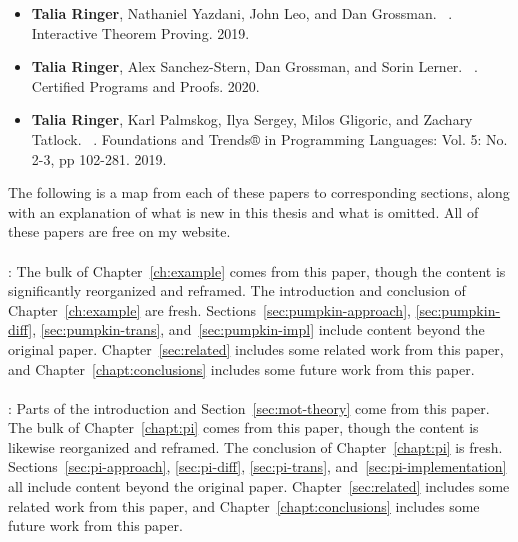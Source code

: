 \begin{itemize}
\item \textbf{Talia Ringer}, Nathaniel Yazdani, John Leo, and Dan Grossman. ~\cite{Ringer2019}. Interactive Theorem Proving. 2019.
\item \textbf{Talia Ringer}, Alex Sanchez-Stern, Dan Grossman, and Sorin Lerner. ~\cite{replica}. Certified Programs and Proofs. 2020.
\item \textbf{Talia Ringer}, Karl Palmskog, Ilya Sergey, Milos Gligoric, and Zachary Tatlock. ~\cite{PGL-045}. Foundations and Trends® in Programming Languages: Vol. 5: No. 2-3, pp 102-281. 2019. 
\end{itemize}
The following is a map from each of these papers to corresponding sections,
along with an explanation of what is new in this thesis and what is omitted.
All of these papers are free on my website.

\paragraph{}\hspace{-0.6cm}
:
The bulk of Chapter~\ref{ch:example} comes from this paper,
though the content is significantly reorganized and reframed.
The introduction and conclusion of Chapter~\ref{ch:example} are fresh.
Sections~\ref{sec:pumpkin-approach}, \ref{sec:pumpkin-diff}, \ref{sec:pumpkin-trans}, and~\ref{sec:pumpkin-impl}
include content beyond the original paper.
Chapter~\ref{sec:related} includes some related work from this paper,
and Chapter~\ref{chapt:conclusions} includes some future work from this paper.

\paragraph{}\hspace{-0.6cm}
:
Parts of the introduction and Section~\ref{sec:mot-theory} come from this paper.
The bulk of Chapter~\ref{chapt:pi} comes from this paper,
though the content is likewise reorganized and reframed.
The conclusion of Chapter~\ref{chapt:pi} is fresh.
Sections~\ref{sec:pi-approach}, \ref{sec:pi-diff}, \ref{sec:pi-trans}, and~\ref{sec:pi-implementation}
all include content beyond the original paper.
Chapter~\ref{sec:related} includes some related work from this paper,
and Chapter~\ref{chapt:conclusions} includes some future work from this paper.

